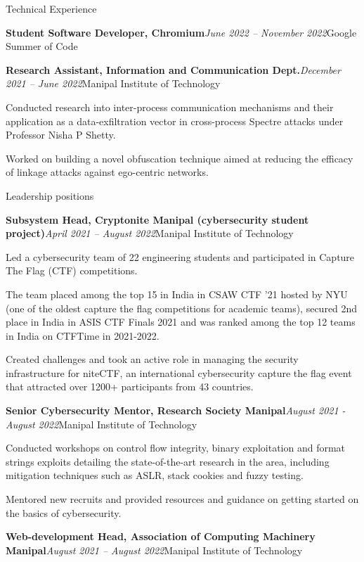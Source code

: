 \documentclass{resume} %
\begin{document}
\begin{rSection}{Technical Experience}
\begin{rSubsection}{\bf Student Software Developer, Chromium}{\em June 2022 -- November 2022}{Google Summer of Code}{}
\end{rSubsection}
\begin{rSubsection}{\bf Research Assistant, Information and Communication Dept.}{\em December 2021 -- June 2022}{Manipal Institute of Technology}{}
\item Conducted research into inter-process communication mechanisms and their application as a data-exfiltration vector in cross-process Spectre attacks under Professor Nisha P Shetty.
\item Worked on building a novel obfuscation technique aimed at reducing the efficacy of linkage attacks against ego-centric networks.
\end{rSubsection}
\begin{rSection}{Leadership positions}
\begin{rSubsection}{\bf Subsystem Head, Cryptonite Manipal (cybersecurity student project)}{\em April 2021 -- August 2022}{Manipal Institute of Technology}{}
\item Led a cybersecurity team of 22 engineering students and participated in Capture The Flag (CTF) competitions. 
\item The team placed among the top 15 in India in CSAW CTF '21 hosted by NYU (one of the oldest capture the flag competitions for academic teams), secured 2nd place in India in ASIS CTF Finals 2021 and was ranked among the top 12 teams in India on CTFTime in 2021-2022.
\item Created challenges and took an active role in managing the security infrastructure for niteCTF, an international cybersecurity capture the flag event that attracted over 1200+ participants from 43 countries.
\end{rSubsection}
\begin{rSubsection}{\bf Senior Cybersecurity Mentor, Research Society Manipal}{\em August 2021 - August 2022}{Manipal Institute of Technology}{}
\item Conducted workshops on control flow integrity, binary exploitation and format strings exploits detailing the state-of-the-art research in the area, including mitigation techniques such as ASLR, stack cookies and fuzzy testing.
\item Mentored new recruits and provided resources and guidance on getting started on the basics of cybersecurity.
\end{rSubsection}
\end{rSection}
\begin{rSubsection}{\bf Web-development Head, Association of Computing Machinery Manipal}{\em August 2021 -- August 2022}{Manipal Institute of Technology}{}

\end{rSubsection}
\end{rSection}
\end{document}
